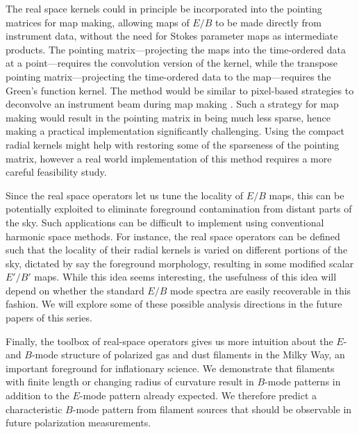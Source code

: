 The real space kernels could in principle be incorporated into the pointing matrices for map making, allowing maps of $E/B$ to be made directly from instrument data, without the need for Stokes parameter maps as intermediate products.
  The pointing matrix---projecting the maps into the time-ordered data at a point---requires the convolution version of the kernel, while the transpose pointing matrix---projecting the time-ordered data to the map---requires the Green's function kernel.
  The method would be similar to pixel-based strategies to deconvolve an instrument beam during map making \citep[e.g.][]{2010ApJS..187..212C}. Such a strategy for map making would result in the pointing matrix in being much less sparse, hence making a practical implementation significantly challenging. Using the compact radial kernels might help with restoring some of the sparseness of the pointing matrix, however a real world implementation of this method requires a more careful feasibility study.
 
Since the real space operators let us tune the locality of $E/B$ maps, this can be potentially exploited to eliminate foreground contamination from distant parts of the sky. Such applications can be difficult to implement using conventional harmonic space methods.  For instance, the real space operators can be defined such that the locality of their radial kernels is varied on different portions of the sky, dictated by say the foreground morphology, resulting in some modified scalar $E'/B'$ maps.  While this idea seems interesting, the usefulness of this idea will depend on whether the standard $E/B$ mode spectra are easily recoverable in this fashion.  We will explore some of these possible analysis directions in the future papers of this series.

Finally, the toolbox of real-space operators gives us more intuition about the $E$- and $B$-mode structure of polarized gas and dust filaments in the Milky Way, an important foreground for inflationary science. We demonstrate that filaments with finite length or changing radius of curvature result in $B$-mode patterns in addition to the $E$-mode pattern already expected.  We therefore predict a characteristic $B$-mode pattern from filament sources that should be observable in future polarization measurements.

